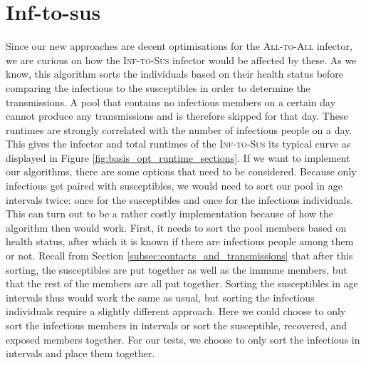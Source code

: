 \section{Inf-to-sus}
\label{sec:inf-to-sus}
Since our new approaches are decent optimisations for the \textsc{All-to-All} infector, we are curious on how the \textsc{Inf-to-Sus} infector would be affected by these. As we know, this algorithm sorts the individuals based on their health status before comparing the infectious to the susceptibles in order to determine the transmissions. A pool that contains no infectious members on a certain day cannot produce any transmissions and is therefore skipped for that day. These runtimes are strongly correlated with the number of infectious people on a day. This gives the infector and total runtimes of the \textsc{Inf-to-Sus} its typical curve as displayed in Figure \ref{fig:basis_opt_runtime_sections}. If we want to implement our algorithms, there are some options that need to be considered. Because only infectious get paired with susceptibles, we would need to sort our pool in age intervals twice: once for the susceptibles and once for the infectious individuals. This can turn out to be a rather costly implementation because of how the algorithm then would work. First, it needs to sort the pool members based on health status, after which it is known if there are infectious people among them or not. Recall from Section \ref{subsec:contacts_and_transmissions} that after this sorting, the susceptibles are put together as well as the immune members, but that the rest of the members are all put together. Sorting the susceptibles in age intervals thus would work the same as usual, but sorting the infectious individuals require a slightly different approach. Here we could choose to only sort the infectious members in intervals or sort the susceptible, recovered, and exposed members together. For our tests, we choose to only sort the infectious in intervals and place them together.


